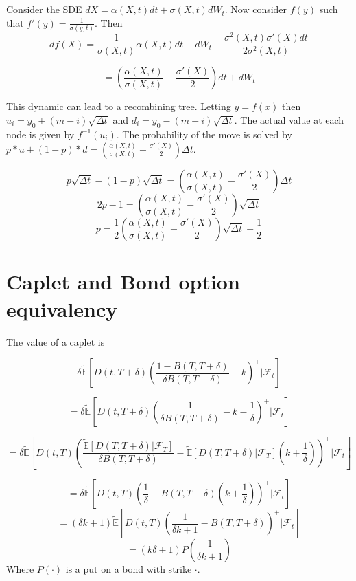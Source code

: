 \documentclass{article}
\theoremstyle{definition}
\begin{document}


\section{}
Consider the SDE \(dX=\alpha(X, t)dt+\sigma(X, t)dW_t\).  Now consider \(f(y)\) such that \(f'(y)=\frac{1}{\sigma(y, t)}\).  Then \[df(X)=\frac{1}{\sigma(X, t)} \alpha(X, t)dt+dW_t-\frac{\sigma^2(X, t)\sigma'(X)dt}{2\sigma^2(X, t)}\]

\[=\left(\frac{\alpha(X, t)}{\sigma(X, t)}-\frac{\sigma'(X)}{2}\right)dt+dW_t\]
 
 This dynamic can lead to a recombining tree.  Letting \(y=f(x)\) then \(u_i=y_0+(m-i)\sqrt{\Delta t}\) and \(d_i=y_0-(m-i)\sqrt{\Delta t}\).  The actual value at each node is given by \(f^{-1}(u_i)\). The probability of the move is solved by \(p*u+(1-p)*d=\left(\frac{\alpha(X, t)}{\sigma(X, t)}-\frac{\sigma'(X)}{2}\right)\Delta t\). 
 
 \[p\sqrt{\Delta t}-(1-p)\sqrt{\Delta t}=\left(\frac{\alpha(X, t)}{\sigma(X, t)}-\frac{\sigma'(X)}{2}\right)\Delta t\]
  \[2p-1=\left(\frac{\alpha(X, t)}{\sigma(X, t)}-\frac{\sigma'(X)}{2}\right)\sqrt{\Delta t}\]
  \[p=\frac{1}{2}\left(\frac{\alpha(X, t)}{\sigma(X, t)}-\frac{\sigma'(X)}{2}\right)\sqrt{\Delta t}+\frac{1}{2}\]
  
  \section{Caplet and Bond option equivalency}
  
  The value of a caplet is 
  
\[\delta\mathbb{\tilde{E}}\left[D(t, T+\delta)\left(\frac{1-B(T, T+\delta)}{\delta B(T, T+\delta)}-k\right)^+ |\mathcal{F}_t\right]\]

\[=\delta\mathbb{\tilde{E}}\left[D(t, T+\delta)\left(\frac{1}{\delta B(T, T+\delta)}-k-\frac{1}{\delta}\right)^+ |\mathcal{F}_t\right]\]
 
\[=\delta\mathbb{\tilde{E}}\left[D(t, T)\left(\frac{ \mathbb{\tilde{E}}[D(T, T+\delta)|\mathcal{F}_T]}{\delta B(T, T+\delta)}-\mathbb{\tilde{E}}[D(T, T+\delta)|\mathcal{F}_T]\left(k+\frac{1}{\delta}\right)\right)^+ |\mathcal{F}_t\right]\]

\[=\delta\mathbb{\tilde{E}}\left[D(t, T)\left(\frac{1}{\delta}-B(T, T+\delta)\left(k+\frac{1}{\delta}\right)\right)^+ |\mathcal{F}_t\right]\]
\[=\left(\delta k+1\right)\mathbb{\tilde{E}}\left[D(t, T)\left(\frac{1}{\delta k+1}-B(T, T+\delta)\right)^+ |\mathcal{F}_t\right]\]
\[=\left(k\delta+1\right)P\left(\frac{1}{\delta k +1}\right)\] Where \(P(\cdot)\) is a put on a bond with strike \(\cdot\).
\end{document}
